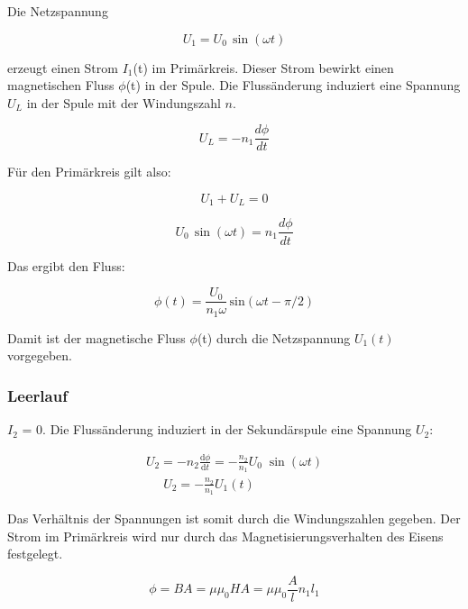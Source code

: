 \documentclass[11pt,ngerman]{scrartcl}
\newcommand{\der}[2]{\frac{\mathrm{d}#1}{\mathrm{d}#2}}
\begin{document}
Die Netzspannung

\begin{equation}
	U_1 = U_0 \, \sin{(\omega t)}
\end{equation}

erzeugt einen Strom $I_1$(t) im Primärkreis. Dieser Strom bewirkt einen magnetischen Fluss $\phi$(t)
in der Spule. Die Flussänderung induziert eine Spannung $U_L$ in der Spule mit der Windungszahl
$n$.

\begin{equation}
	U_L = -n_1 \frac{d\phi}{dt}
\end{equation}

Für den Primärkreis gilt also:

\begin{equation}
	U_1 + U_L = 0
\end{equation}

\begin{equation}
	U_0 \, \sin{(\omega t)} = n_1 \frac{d\phi}{dt}
\end{equation}

Das ergibt den Fluss:

\begin{equation}
	\phi (t) = \frac{U_0}{n_1 \omega} \, \textrm{sin}(\omega t - \pi / 2)
\end{equation}

Damit ist der magnetische Fluss $\phi$(t) durch die Netzspannung $U_1(t)$ vorgegeben.

\newpage

\subsubsection{Leerlauf}

$I_2$ = 0. Die Flussänderung induziert in der Sekundärspule eine Spannung $U_2$:

\begin{align*}
	U_2 = - n_2 \der{\phi}{t} = -\frac{n_2}{n_1} U_0 \; \sin{(\omega t)}
\end{align*}
\begin{align}
	U_2 = -\frac{n_2}{n_1} U_1(t) \qquad \qquad
\end{align}

Das Verhältnis der Spannungen ist somit durch die Windungszahlen gegeben. Der Strom im
Primärkreis wird nur durch das Magnetisierungsverhalten des Eisens festgelegt.

\begin{equation}
	\phi = B A = \mu \mu_0 H A = \mu \mu_0 \frac{A}{l} n_1 l_1
\end{equation}
\end{document}
